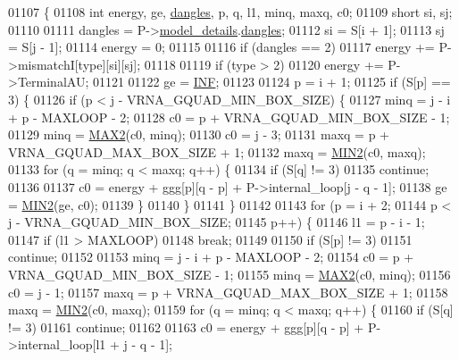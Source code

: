 \begin{DoxyCode}
01107 \{
01108   \textcolor{keywordtype}{int}   energy, ge, \hyperlink{group__model__details_ga72b511ed1201f7e23ec437e468790d74}{dangles}, p, q, l1, minq, maxq, c0;
01109   \textcolor{keywordtype}{short} si, sj;
01110 
01111   dangles = P->\hyperlink{group__energy__parameters_a7b84353eb9075c595bad4ceb871bcae7}{model\_details}.\hyperlink{group__model__details_adcda4ff2ea77748ae0e8700288282efc}{dangles};
01112   si      = S[i + 1];
01113   sj      = S[j - 1];
01114   energy  = 0;
01115 
01116   \textcolor{keywordflow}{if} (dangles == 2)
01117     energy += P->mismatchI[type][si][sj];
01118 
01119   \textcolor{keywordflow}{if} (type > 2)
01120     energy += P->TerminalAU;
01121 
01122   ge = \hyperlink{constants_8h_a12c2040f25d8e3a7b9e1c2024c618cb6}{INF};
01123 
01124   p = i + 1;
01125   \textcolor{keywordflow}{if} (S[p] == 3) \{
01126     \textcolor{keywordflow}{if} (p < j - VRNA\_GQUAD\_MIN\_BOX\_SIZE) \{
01127       minq  = j - i + p - MAXLOOP - 2;
01128       c0    = p + VRNA\_GQUAD\_MIN\_BOX\_SIZE - 1;
01129       minq  = \hyperlink{group__utils_ga33297b3679c713b0c4d897cd0fe3b122}{MAX2}(c0, minq);
01130       c0    = j - 3;
01131       maxq  = p + VRNA\_GQUAD\_MAX\_BOX\_SIZE + 1;
01132       maxq  = \hyperlink{group__utils_gae0b9cd0ce090bd69b951aa73e8fa4f7d}{MIN2}(c0, maxq);
01133       \textcolor{keywordflow}{for} (q = minq; q < maxq; q++) \{
01134         \textcolor{keywordflow}{if} (S[q] != 3)
01135           \textcolor{keywordflow}{continue};
01136 
01137         c0  = energy + ggg[p][q - p] + P->internal\_loop[j - q - 1];
01138         ge  = \hyperlink{group__utils_gae0b9cd0ce090bd69b951aa73e8fa4f7d}{MIN2}(ge, c0);
01139       \}
01140     \}
01141   \}
01142 
01143   \textcolor{keywordflow}{for} (p = i + 2;
01144        p < j - VRNA\_GQUAD\_MIN\_BOX\_SIZE;
01145        p++) \{
01146     l1 = p - i - 1;
01147     \textcolor{keywordflow}{if} (l1 > MAXLOOP)
01148       \textcolor{keywordflow}{break};
01149 
01150     \textcolor{keywordflow}{if} (S[p] != 3)
01151       \textcolor{keywordflow}{continue};
01152 
01153     minq  = j - i + p - MAXLOOP - 2;
01154     c0    = p + VRNA\_GQUAD\_MIN\_BOX\_SIZE - 1;
01155     minq  = \hyperlink{group__utils_ga33297b3679c713b0c4d897cd0fe3b122}{MAX2}(c0, minq);
01156     c0    = j - 1;
01157     maxq  = p + VRNA\_GQUAD\_MAX\_BOX\_SIZE + 1;
01158     maxq  = \hyperlink{group__utils_gae0b9cd0ce090bd69b951aa73e8fa4f7d}{MIN2}(c0, maxq);
01159     \textcolor{keywordflow}{for} (q = minq; q < maxq; q++) \{
01160       \textcolor{keywordflow}{if} (S[q] != 3)
01161         \textcolor{keywordflow}{continue};
01162 
01163       c0  = energy + ggg[p][q - p] + P->internal\_loop[l1 + j - q - 1];

\end{DoxyCode}
